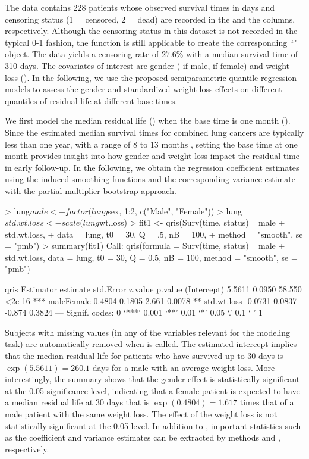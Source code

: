 The  data contains 228 patients whose observed survival times in days and 
censoring status (1 = censored, 2 = dead) are recorded in the  and the  columns, 
respectively.
Although the censoring status in this dataset is not recorded in the typical 0-1 fashion,
the  function is still applicable to create the corresponding ``" object.
The  data yields a censoring rate of $27.6\%$ with a median survival time of 310 days. 
The covariates of interest are gender ( if male,  if female) and 
weight loss ().
In the following, we use the proposed semiparametric quantile regression models to assess 
the gender and standardized weight loss effects on different quantiles of residual life at different base times.


We first model the median residual life () when the base time is one month ().
Since the estimated median survival times for combined lung cancers are typically less than one year, 
with a range of 8 to 13 months \citep{siegel2021cancer}, 
setting the base time at one month provides insight into how gender and weight loss impact the residual time 
in early follow-up. 
In the following, we obtain the regression coefficient estimates using the induced smoothing functions and 
the corresponding variance estimate with the partial multiplier bootstrap approach.

\begin{example}
  > lung$male <- factor(lung$sex, 1:2, c("Male", "Female"))
  > lung$std.wt.loss <- scale(lung$wt.loss)
  > fit1 <- qris(Surv(time, status) ~ male + std.wt.loss,
  +              data = lung, t0 = 30, Q = .5, nB = 100,
  +              method = "smooth", se = "pmb")
  > summary(fit1)
  Call:
  qris(formula = Surv(time, status) ~ male + std.wt.loss,
  data = lung, t0 = 30, Q = 0.5, nB = 100, method = "smooth", 
  se = "pmb")

  qris Estimator
                 estimate std.Error z.value p.value    
  (Intercept)      5.5611    0.0950  58.550  <2e-16 ***
  maleFemale       0.4804    0.1805   2.661  0.0078 ** 
  std.wt.loss     -0.0731    0.0837  -0.874  0.3824    
  ---
  Signif. codes:  0 ‘***’ 0.001 ‘**’ 0.01 ‘*’ 0.05 ‘.’ 0.1 ‘ ’ 1
\end{example}
% 

Subjects with missing values (in any of the variables relevant for the modeling task) 
are automatically removed when  is called. 
The estimated intercept implies that the median residual life for patients who have survived up to 30 days 
is $\exp(5.5611) = 260.1$ days for a male with an average weight loss.
More interestingly, the summary shows that the gender effect is statistically significant at the 0.05 significance level, 
indicating that a female patient is expected to have a median residual life at 30 days that is $\exp(0.4804) = 1.617$
times that of a male patient with the same weight loss.
The effect of the weight loss is not statistically significant at the 0.05 level.
In addition to , important statistics such as the coefficient and variance estimates can be extracted by 
 methods  and , respectively.

